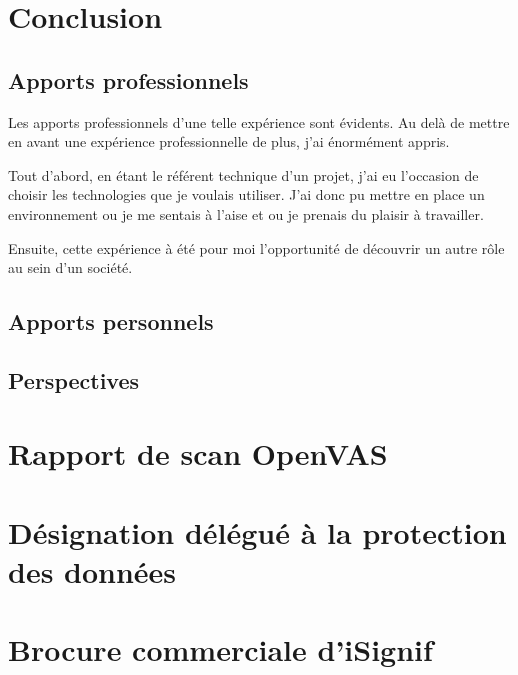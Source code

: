 \documentclass[]{report}
\begin{document}

\chapter{Conclusion}

  \section{Apports professionnels}

    Les apports professionnels d'une telle expérience sont évidents. Au delà de mettre en avant une expérience professionnelle de plus, j'ai énormément appris.

    Tout d'abord, en étant le référent technique d'un projet, j'ai eu l'occasion de choisir les technologies que je voulais utiliser. J'ai donc pu mettre en place un environnement ou je me sentais à l'aise et ou je prenais du plaisir à travailler.

    Ensuite, cette expérience à été pour moi l'opportunité de découvrir un autre rôle au sein d'un société.


  \section{Apports personnels}


  \section{Perspectives}



\begin{appendix}
    \chapter{Rapport de scan OpenVAS}\label{apx:openvas_report}
    

    \chapter{Désignation délégué
à la protection des données}\label{apx:dpo}
    

    \chapter{Brocure commerciale d'iSignif}\label{apx:brochure}
    
\end{appendix}
\end{document}
